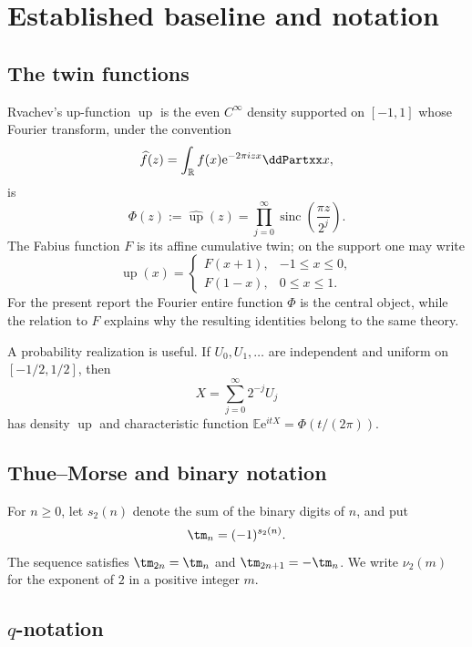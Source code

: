 \documentclass[11pt]{article}
\numberwithin{equation}{section}
\theoremstyle{definition}
\theoremstyle{remark}
\newcommand{\R}{\mathbb R}
\newcommand{\Up}{\operatorname{up}}
\newcommand{\sinc}{\operatorname{sinc}}
\newcommand{\e}{\mathrm e}
\begin{document}
\section{Established baseline and notation}

\subsection{The twin functions}

Rvachev's up-function $\Up$ is the even $C^\infty$ density supported on $[-1,1]$ whose Fourier transform, under the convention
\[
 \widehat f(z)=\int_{\R}f(x)\e^{-2\pi i z x}\ddPartxx x,
\]
is
\begin{equation}\label{p7:eq:Phi-sinc}
 \Phi(z):=\widehat{\Up}(z)
 =\prod_{j=0}^{\infty}\sinc\!\left(\frac{\pi z}{2^j}\right).
\end{equation}
The Fabius function $F$ is its affine cumulative twin; on the support one may write
\[
 \Up(x)=
 \begin{cases}
 F(x+1),&-1\le x\le0,\\
 F(1-x),&0\le x\le1.
 \end{cases}
\]
For the present report the Fourier entire function $\Phi$ is the central object, while the relation to $F$ explains why the resulting identities belong to the same theory.

A probability realization is useful.  If $U_0,U_1,\ldots$ are independent and uniform on $[-1/2,1/2]$, then
\begin{equation}\label{p7:eq:prob-sum}
 X=\sum_{j=0}^{\infty}2^{-j}U_j
\end{equation}
has density $\Up$ and characteristic function $\mathbb E\e^{itX}=\Phi(t/(2\pi))$.

\subsection{Thue--Morse and binary notation}

For $n\ge0$, let $s_2(n)$ denote the sum of the binary digits of $n$, and put
\begin{equation}\label{p7:eq:tm}
 \tm_n=(-1)^{s_2(n)}.
\end{equation}
The sequence satisfies $\tm_{2n}=\tm_n$ and $\tm_{2n+1}=-\tm_n$.  We write $\nu_2(m)$ for the exponent of $2$ in a positive integer $m$.

\subsection{$q$-notation}
\end{document}
